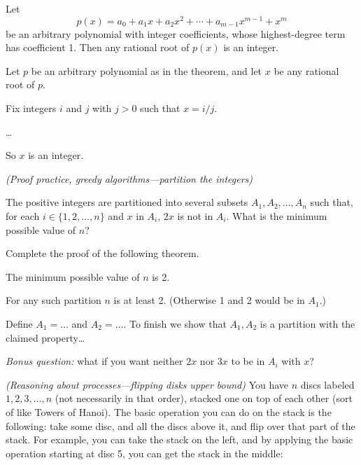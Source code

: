 \begin{theorem}
  Let 
  \[p(x) = a_0 + a_1 x + a_2 x^2 + \cdots + a_{m-1} x^{m-1} + x^m\]
  be an arbitrary polynomial with integer coefficients, whose highest-degree term
  has coefficient 1.
  Then any rational root of $p(x)$ is an integer.
\end{theorem}
\begin{longFormProof}
  \step Let $p$ be an arbitrary polynomial as in the theorem,
  and let $x$ be any rational root of $p$.

  \step Fix integers $i$ and $j$ with $j>0$ such that $x=i/j$.
  
  \step \ldots

  \step So $x$ is an integer.
\end{longFormProof}

\exercise \emph{(Proof practice, greedy algorithms---partition the integers)}

The positive integers are partitioned into several subsets $A_1,A_2,\ldots ,A_n$ such that, 
for each $i\in\{1,2,\ldots ,n\}$ and $x$ in $A_i$, $2x$ is not in $A_i$. 
What is the minimum possible value of $n$?

Complete the proof of the following theorem.
\begin{theorem}
  The minimum possible value of $n$ is 2.
\end{theorem}
\begin{longFormProof}
  \step For any such partition $n$ is at least 2.
  (Otherwise 1 and 2 would be in $A_1$.)

  \step Define $A_1 = \ldots$ and $A_2 = \ldots$.
  \step To finish we show that $A_1, A_2$ is a partition with the claimed property\ldots
\end{longFormProof}

\emph{Bonus question:} what if you want neither $2x$ nor $3x$ to be in $A_i$ with $x$?


\exercise \emph{(Reasoning about processes---flipping disks upper bound)}\label{proofs: exercise: flipping discs}
You have $n$ discs labeled $1,2,3,\ldots,n$ (not necessarily in that order),
stacked one on top of each other (sort of like Towers of Hanoi).
The basic operation you can do on the stack is the following:
take some disc, and all the discs above it, and flip over that
part of the stack.
For example, you can take the stack on the left,
and by applying the basic operation starting at disc 5, you can get the stack in the middle:

